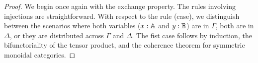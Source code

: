 \documentclass[10pt,a4paper]{amsart}
\theoremstyle{definition}
\theoremstyle{definition}
\theoremstyle{definition}
\theoremstyle{definition}
\theoremstyle{definition}
\theoremstyle{definition}
\begin{document}
\begin{proof}
  We begin once again with the exchange property. The rules involving injections are straightforward. With respect to the rule (case), we distinguish between the scenarios where both variables ($x : \mathbb{A}$ and $y : \mathbb{B}$) are in $\Gamma$, both are in $\Delta$, or they are distributed across $\Gamma$ and $\Delta$.
  The fist case follows by induction, the bifunctoriality of the tensor product, and the coherence theorem for symmetric monoidal categories.


\end{proof}
\end{document}
